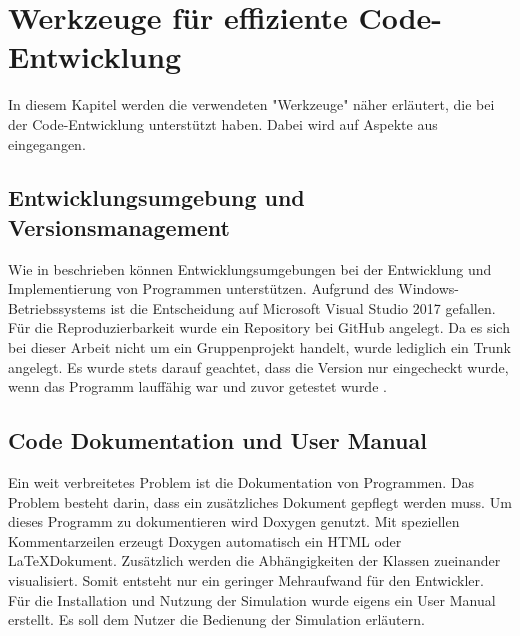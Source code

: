 \chapter{Werkzeuge für effiziente Code-Entwicklung}
In diesem Kapitel werden die verwendeten "Werkzeuge" näher erläutert, die bei der Code-Entwicklung unterstützt haben. Dabei wird auf Aspekte aus \cite{Kessler.Sommersemester2017} eingegangen.

\section{Entwicklungsumgebung und Versionsmanagement}
Wie in \cite{Kessler.Sommersemester2017} beschrieben können Entwicklungsumgebungen bei der Entwicklung und Implementierung von Programmen unterstützen. Aufgrund des Windows-Betriebssystems ist die Entscheidung auf  Microsoft Visual Studio 2017 gefallen. Für die Reproduzierbarkeit wurde ein Repository bei GitHub angelegt. Da es sich bei dieser Arbeit nicht um ein Gruppenprojekt handelt, wurde lediglich ein Trunk angelegt. Es wurde stets darauf geachtet, dass die Version nur eingecheckt wurde, wenn das Programm lauffähig war und zuvor getestet wurde \cite{Kessler.Sommersemester2017}.  
\section{Code Dokumentation und User Manual}
Ein weit verbreitetes Problem ist die Dokumentation von Programmen. Das Problem besteht darin, dass ein zusätzliches Dokument gepflegt werden muss. Um dieses Programm zu dokumentieren wird Doxygen genutzt. Mit speziellen Kommentarzeilen erzeugt Doxygen automatisch ein HTML oder \LaTeX Dokument. Zusätzlich werden die Abhängigkeiten der Klassen zueinander visualisiert. Somit entsteht nur ein geringer Mehraufwand für den Entwickler. \\
Für die Installation und Nutzung der Simulation wurde eigens ein User Manual erstellt. Es soll dem Nutzer die Bedienung der Simulation erläutern. 
\newpage
